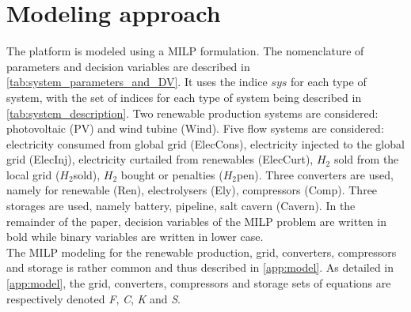 \section{Modeling approach} \label{Models}

The platform is modeled using a MILP formulation. The nomenclature of parameters and decision variables are described in \autoref{tab:system_parameters_and_DV}.
It uses the indice $sys$ for each type of system, with the set of indices for each type of system being described in \autoref{tab:system_description}.
Two renewable production systems are considered: photovoltaic (PV) and wind tubine (Wind). Five flow systems are considered: electricity consumed from global grid (ElecCons), electricity injected to the global grid (ElecInj), electricity curtailed from renewables (ElecCurt), $H_2$ sold from the local grid ($H_2$sold), $H_2$ bought or penalties ($H_2$pen).
Three converters are used, namely for renewable (Ren), electrolysers (Ely), compressors (Comp). Three storages are used, namely battery, pipeline, salt cavern (Cavern). In the remainder of the paper, decision variables of the MILP problem are written in bold while binary variables are written in lower case.\\
The MILP modeling for the renewable production, grid, converters, compressors and storage is rather common and thus described in \ref{app:model}. As detailed in \ref{app:model}, the grid, converters, compressors and storage sets of equations are respectively denoted \textit{F}, \textit{C}, \textit{K} and \textit{S}.

